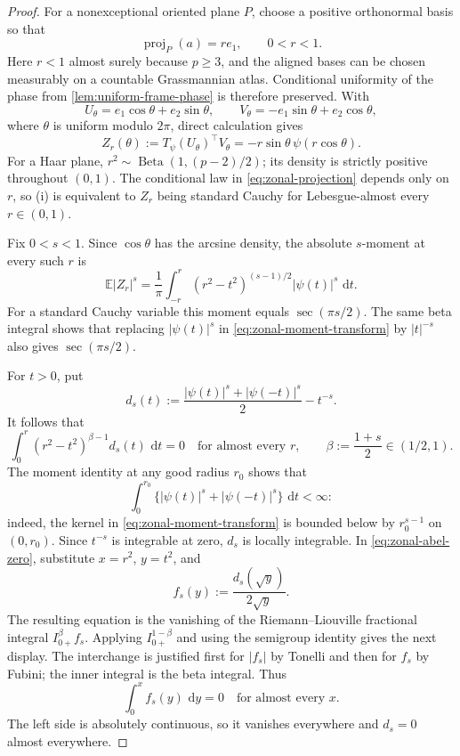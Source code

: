 \documentclass[10pt,a4paper]{amsart}
\newcommand{\Beta}{\operatorname{Beta}}
\newcommand{\E}{\mathbb E}
\newcommand{\dd}{\,\mathrm d}
\begin{document}
\begin{proof}
For a nonexceptional oriented plane \(P\), choose a positive orthonormal
basis so that
\[
  \operatorname{proj}_P(a)=r e_1,
  \qquad 0<r<1.
\]
Here \(r<1\) almost surely because \(p\geq3\), and the aligned bases can be
chosen measurably on a countable Grassmannian atlas.  Conditional uniformity
of the phase from \cref{lem:uniform-frame-phase} is therefore preserved.
With
\[
  U_\theta=e_1\cos\theta+e_2\sin\theta,
  \qquad
  V_\theta=-e_1\sin\theta+e_2\cos\theta,
\]
where \(\theta\) is uniform modulo \(2\pi\), direct calculation gives
\begin{equation}
  Z_r(\theta)
  :=
  T_\psi(U_\theta)^\top V_\theta
  =
  -r\sin\theta\,\psi(r\cos\theta).
  \label{eq:zonal-projection}
\end{equation}
For a Haar plane,
\(r^2\sim\Beta(1,(p-2)/2)\); its density is strictly positive throughout
\((0,1)\).  The conditional law in \cref{eq:zonal-projection} depends only
on \(r\), so \textup{(i)} is equivalent to \(Z_r\) being standard Cauchy
for Lebesgue-almost every \(r\in(0,1)\).

Fix \(0<s<1\).  Since \(\cos\theta\) has the arcsine density, the absolute
\(s\)-moment at every such \(r\) is
\begin{equation}
  \E|Z_r|^s
  =
  \frac1\pi
  \int_{-r}^r
  (r^2-t^2)^{(s-1)/2}|\psi(t)|^s\,\dd t.
  \label{eq:zonal-moment-transform}
\end{equation}
For a standard Cauchy variable this moment equals
\(\sec(\pi s/2)\).  The same beta integral shows that replacing
\(|\psi(t)|^s\) in \cref{eq:zonal-moment-transform} by \(|t|^{-s}\)
also gives \(\sec(\pi s/2)\).

For \(t>0\), put
\[
  d_s(t)
  :=
  \frac{|\psi(t)|^s+|\psi(-t)|^s}{2}-t^{-s}.
\]
It follows that
\begin{equation}
  \int_0^r
  (r^2-t^2)^{\beta-1}d_s(t)\,\dd t=0
  \quad\text{for almost every }r,
  \qquad
  \beta:=\frac{1+s}{2}\in(1/2,1).
  \label{eq:zonal-abel-zero}
\end{equation}
The moment identity at any good radius \(r_0\) shows that
\[
  \int_0^{r_0}
  \bigl\{|\psi(t)|^s+|\psi(-t)|^s\bigr\}\,\dd t<\infty:
\]
indeed, the kernel in \cref{eq:zonal-moment-transform} is bounded below by
\(r_0^{s-1}\) on \((0,r_0)\).  Since \(t^{-s}\) is integrable at zero,
\(d_s\) is locally integrable.  In
\cref{eq:zonal-abel-zero}, substitute \(x=r^2\), \(y=t^2\), and
\[
  f_s(y):=\frac{d_s(\sqrt y)}{2\sqrt y}.
\]
The resulting equation is the vanishing of the
Riemann--Liouville fractional integral \(I_{0+}^{\beta}f_s\).  Applying
\(I_{0+}^{1-\beta}\) and using the semigroup identity gives the next
display.  The interchange is justified first for \(|f_s|\) by Tonelli and
then for \(f_s\) by Fubini; the inner integral is the beta integral.  Thus
\[
  \int_0^x f_s(y)\,\dd y=0
  \quad\text{for almost every }x.
\]
The left side is absolutely continuous, so it vanishes everywhere and
\(d_s=0\) almost everywhere.


\end{proof}
\end{document}
